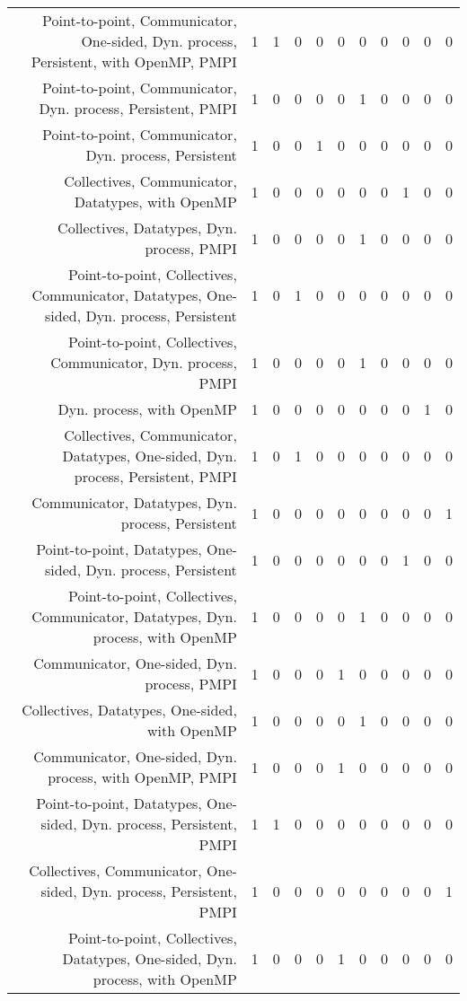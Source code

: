 {\begin{landscape}
\begin{longtable}[htb]{r|c|c|c|c|c|c|c|c|c|c}
{Point-to-point, Communicator, One-sided, Dyn. process, Persistent, with OpenMP, PMPI} & 1 & 1 & 0 & 0 & 0 & 0 & 0 & 0 & 0 & 0 \\%
{Point-to-point, Communicator, Dyn. process, Persistent, PMPI} & 1 & 0 & 0 & 0 & 0 & 1 & 0 & 0 & 0 & 0 \\%
{Point-to-point, Communicator, Dyn. process, Persistent} & 1 & 0 & 0 & 1 & 0 & 0 & 0 & 0 & 0 & 0 \\%
{Collectives, Communicator, Datatypes, with OpenMP} & 1 & 0 & 0 & 0 & 0 & 0 & 0 & 1 & 0 & 0 \\%
{Collectives, Datatypes, Dyn. process, PMPI} & 1 & 0 & 0 & 0 & 0 & 1 & 0 & 0 & 0 & 0 \\%
{Point-to-point, Collectives, Communicator, Datatypes, One-sided, Dyn. process, Persistent} & 1 & 0 & 1 & 0 & 0 & 0 & 0 & 0 & 0 & 0 \\%
{Point-to-point, Collectives, Communicator, Dyn. process, PMPI} & 1 & 0 & 0 & 0 & 0 & 1 & 0 & 0 & 0 & 0 \\%
{Dyn. process, with OpenMP} & 1 & 0 & 0 & 0 & 0 & 0 & 0 & 0 & 1 & 0 \\%
{Collectives, Communicator, Datatypes, One-sided, Dyn. process, Persistent, PMPI} & 1 & 0 & 1 & 0 & 0 & 0 & 0 & 0 & 0 & 0 \\%
{Communicator, Datatypes, Dyn. process, Persistent} & 1 & 0 & 0 & 0 & 0 & 0 & 0 & 0 & 0 & 1 \\%
{Point-to-point, Datatypes, One-sided, Dyn. process, Persistent} & 1 & 0 & 0 & 0 & 0 & 0 & 0 & 1 & 0 & 0 \\%
{Point-to-point, Collectives, Communicator, Datatypes, Dyn. process, with OpenMP} & 1 & 0 & 0 & 0 & 0 & 1 & 0 & 0 & 0 & 0 \\%
{Communicator, One-sided, Dyn. process, PMPI} & 1 & 0 & 0 & 0 & 1 & 0 & 0 & 0 & 0 & 0 \\%
{Collectives, Datatypes, One-sided, with OpenMP} & 1 & 0 & 0 & 0 & 0 & 1 & 0 & 0 & 0 & 0 \\%
{Communicator, One-sided, Dyn. process, with OpenMP, PMPI} & 1 & 0 & 0 & 0 & 1 & 0 & 0 & 0 & 0 & 0 \\%
{Point-to-point, Datatypes, One-sided, Dyn. process, Persistent, PMPI} & 1 & 1 & 0 & 0 & 0 & 0 & 0 & 0 & 0 & 0 \\%
{Collectives, Communicator, One-sided, Dyn. process, Persistent, PMPI} & 1 & 0 & 0 & 0 & 0 & 0 & 0 & 0 & 0 & 1 \\%
{Point-to-point, Collectives, Datatypes, One-sided, Dyn. process, with OpenMP} & 1 & 0 & 0 & 0 & 1 & 0 & 0 & 0 & 0 & 0 \\%

\end{longtable}
\end{landscape}}
